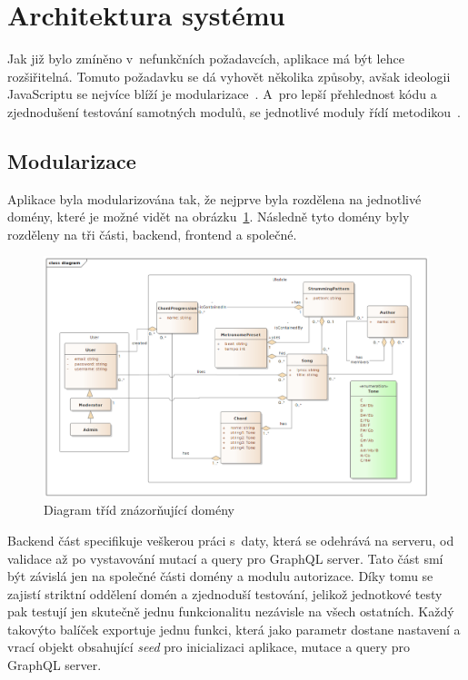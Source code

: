 \section{Architektura systému}
\label{sc:system_architecture}
Jak již bylo zmíněno v~nefunkčních požadavcích, aplikace má být lehce rozšiřitelná. Tomuto požadavku se dá vyhovět několika způsoby, avšak ideologii JavaScriptu se nejvíce blíží je modularizace~\cite{bevacqua_2018_mastering}. A~pro lepší přehlednost kódu a zjednodušení testování samotných modulů, se jednotlivé moduly řídí metodikou~.

\subsection{Modularizace}
Aplikace byla modularizována tak, že nejprve byla rozdělena na jednotlivé domény, které je možné vidět na obrázku~\ref{fig:class_diagram}. Následně tyto domény byly rozděleny na tři části, backend, frontend a společné.

\begin{figure}
    \centering
    \includegraphics[width=\textwidth]{assets/class_diagram.png}
    \caption{Diagram tříd znázorňující domény}
    \label{fig:class_diagram}
\end{figure}

Backend část specifikuje veškerou práci s~daty, která se odehrává na serveru, od validace až po vystavování mutací a query pro GraphQL server. Tato část smí být závislá jen na společné části domény a modulu autorizace. Díky tomu se zajistí striktní oddělení domén a zjednoduší testování, jelikož jednotkové testy pak testují jen skutečně jednu funkcionalitu nezávisle na všech ostatních. Každý takovýto balíček exportuje jednu funkci, která jako parametr dostane nastavení a vrací objekt obsahující \emph{seed} pro inicializaci aplikace, mutace a query pro GraphQL server.

